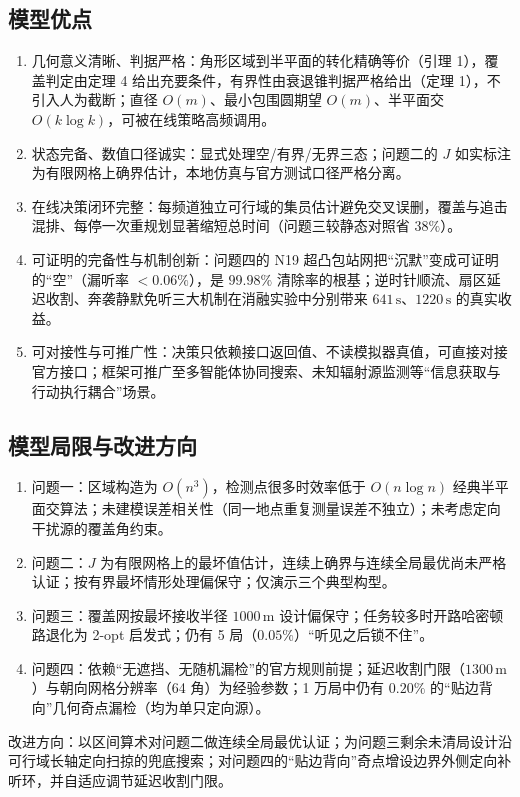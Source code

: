 \documentclass[12pt,a4paper]{article}
\begin{document}
\subsection{模型优点}
\begin{enumerate}
\item 几何意义清晰、判据严格：角形区域到半平面的转化精确等价（引理 1），覆盖判定由定理 4 给出充要条件，有界性由衰退锥判据严格给出（定理 1），不引入人为截断；直径 $O(m)$、最小包围圆期望 $O(m)$、半平面交 $O(k\log k)$，可被在线策略高频调用。
\item 状态完备、数值口径诚实：显式处理空/有界/无界三态；问题二的 $J$ 如实标注为有限网格上确界估计，本地仿真与官方测试口径严格分离。
\item 在线决策闭环完整：每频道独立可行域的集员估计避免交叉误删，覆盖与追击混排、每停一次重规划显著缩短总时间（问题三较静态对照省 $38\%$）。
\item 可证明的完备性与机制创新：问题四的 N19 超凸包站网把“沉默”变成可证明的“空”（漏听率 $<0.06\%$），是 $99.98\%$ 清除率的根基；逆时针顺流、扇区延迟收割、奔袭静默免听三大机制在消融实验中分别带来 $641\,\mathrm{s}$、$1220\,\mathrm{s}$ 的真实收益。
\item 可对接性与可推广性：决策只依赖接口返回值、不读模拟器真值，可直接对接官方接口；框架可推广至多智能体协同搜索、未知辐射源监测等“信息获取与行动执行耦合”场景。
\end{enumerate}

\subsection{模型局限与改进方向}
\begin{enumerate}
\item 问题一：区域构造为 $O(n^{3})$，检测点很多时效率低于 $O(n\log n)$ 经典半平面交算法；未建模误差相关性（同一地点重复测量误差不独立）；未考虑定向干扰源的覆盖角约束。
\item 问题二：$J$ 为有限网格上的最坏值估计，连续上确界与连续全局最优尚未严格认证；按有界最坏情形处理偏保守；仅演示三个典型构型。
\item 问题三：覆盖网按最坏接收半径 $1000\,\mathrm{m}$ 设计偏保守；任务较多时开路哈密顿路退化为 2-opt 启发式；仍有 5 局（$0.05\%$）“听见之后锁不住”。
\item 问题四：依赖“无遮挡、无随机漏检”的官方规则前提；延迟收割门限（$1300\,\mathrm{m}$）与朝向网格分辨率（64 角）为经验参数；1 万局中仍有 $0.20\%$ 的“贴边背向”几何奇点漏检（均为单只定向源）。
\end{enumerate}
改进方向：以区间算术对问题二做连续全局最优认证；为问题三剩余未清局设计沿可行域长轴定向扫掠的兜底搜索；对问题四的“贴边背向”奇点增设边界外侧定向补听环，并自适应调节延迟收割门限。
\end{document}
